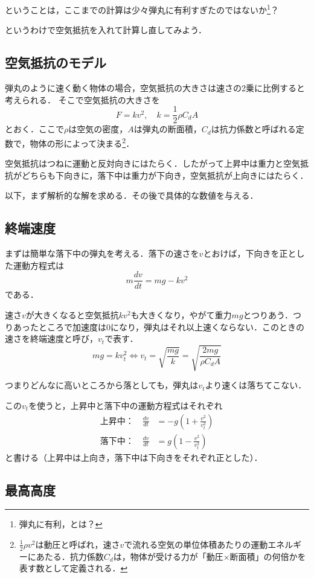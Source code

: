 \documentclass[a4paper,12pt]{jarticle}
\theoremstyle{definition}%
\begin{document}
ということは，ここまでの計算は少々弾丸に有利すぎたのではないか\footnote{弾丸に有利，とは？}？

というわけで空気抵抗を入れて計算し直してみよう．

\subsection{空気抵抗のモデル}

弾丸のように速く動く物体の場合，空気抵抗の大きさは速さの2乗に比例すると考えられる．
そこで空気抵抗の大きさを
\[
F=kv^2, \quad k=\frac{1}{2}\rho C_d A
\]
とおく．ここで$\rho$は空気の密度，$A$は弾丸の断面積，$C_d$は抗力係数と呼ばれる定数で，物体の形によって決まる\footnote{$\frac{1}{2}\rho v^2$は動圧と呼ばれ，速さ$v$で流れる空気の単位体積あたりの運動エネルギーにあたる．抗力係数$C_d$は，物体が受ける力が「動圧$\times$断面積」の何倍かを表す数として定義される．}．

空気抵抗はつねに運動と反対向きにはたらく．したがって上昇中は重力と空気抵抗がどちらも下向きに，落下中は重力が下向き，空気抵抗が上向きにはたらく．

以下，まず解析的な解を求める．その後で具体的な数値を与える．

\subsection{終端速度}

まずは簡単な落下中の弾丸を考える．落下の速さを$v$とおけば，下向きを正とした運動方程式は
\[
m\frac{dv}{dt}=mg-kv^2
\]
である．

速さ$v$が大きくなると空気抵抗$kv^2$も大きくなり，やがて重力$mg$とつりあう．つりあったところで加速度は0になり，弾丸はそれ以上速くならない．このときの速さを終端速度と呼び，$v_t$で表す．
\[
mg=kv_t^2 \iff v_t=\sqrt{\frac{mg}{k}}=\sqrt{\frac{2mg}{\rho C_d A}}
\]

つまりどんなに高いところから落としても，弾丸は$v_t$より速くは落ちてこない．

この$v_t$を使うと，上昇中と落下中の運動方程式はそれぞれ
\begin{align*}
\text{上昇中：}\quad \frac{dv}{dt}&=-g\left(1+\frac{v^2}{v_t^2}\right)\\
\text{落下中：}\quad \frac{dv}{dt}&=g\left(1-\frac{v^2}{v_t^2}\right)
\end{align*}
と書ける（上昇中は上向き，落下中は下向きをそれぞれ正とした）．

\subsection{最高高度}
\end{document}
